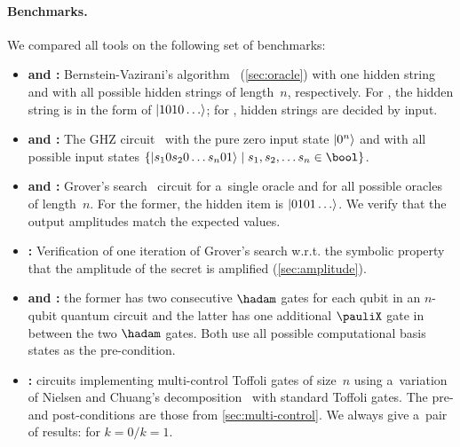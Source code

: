 \paragraph{Benchmarks.}
%
We compared all tools on the following set of benchmarks:%
\begin{itemize}
  \item  
\textbf{\bvsingbench and \bvmultbench:} Bernstein-Vazirani's
algorithm~\cite{BernsteinV93} (\cref{sec:oracle}) with one hidden string and
with all possible hidden strings of length~$n$, respectively. For
\bvsingbench, the hidden string is in the form of $\ket{1010\ldots}$; for
\bvmultbench, hidden strings are decided by input.

\item
\textbf{\ghzsingbench and \ghzmultbench:} The GHZ circuit~\cite{GreenbergerHZ89}
with the pure zero input state $\ket{0^n}$ and with all possible input
states $\{\ket{s_10s_20\ldots s_n01}\mid s_1,s_2,\ldots s_n\in \bool\}$.

\item
\textbf{\groversingbench and \grovermultbench:} Grover's search~\cite{Grover96}
circuit for a~single oracle and for all possible oracles of length~$n$. For the
former, the hidden item is $\ket{0101\ldots}$.
We verify that the output amplitudes match the expected values.

\item
\textbf{\oegroverbench:}
Verification of one iteration of Grover's search w.r.t. the symbolic property
that the amplitude of the secret is amplified (\cref{sec:amplitude}).

\item
\textbf{\hhbench and \hxhbench:} the former has two consecutive $\hadam$ gates for each qubit in an $n$-qubit quantum circuit and the latter has one additional $\pauliX$ gate in between the two $\hadam$ gates. Both use all possible computational basis states as the pre-condition.

\item
\textbf{\mctoffolibench:} circuits implementing multi-control Toffoli gates of size~$n$ using a~variation of Nielsen and Chuang's decomposition~\cite{NielsenC16} with standard Toffoli gates.
The pre- and post-conditions are those from \cref{sec:multi-control}.
We always give a~pair of results: for $k{=}0/k{=}1$.
\end{itemize}





